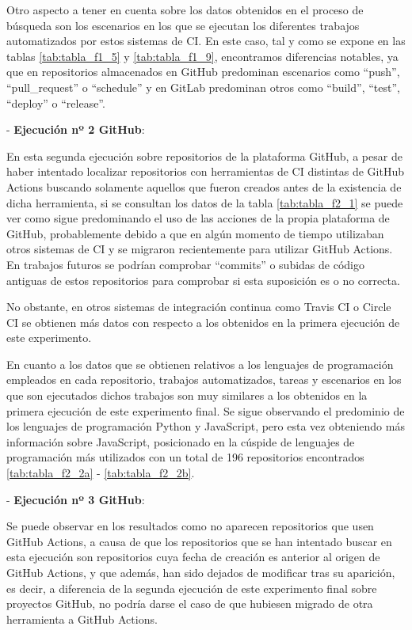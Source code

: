 Otro aspecto a tener en cuenta sobre los datos obtenidos en el proceso de búsqueda son los escenarios en los que se ejecutan los diferentes trabajos automatizados por estos sistemas de CI. En este caso, tal y como se expone en las tablas \ref{tab:tabla_f1_5} y \ref{tab:tabla_f1_9}, encontramos diferencias notables, ya que en repositorios almacenados en GitHub predominan escenarios como ``push'', ``pull\_request'' o ``schedule'' y en GitLab predominan otros como ``build'', ``test'', ``deploy'' o ``release''.

- \textbf{Ejecución nº 2 GitHub}:

En esta segunda ejecución sobre repositorios de la plataforma GitHub, a pesar de haber intentado localizar repositorios con herramientas de CI distintas de GitHub Actions buscando solamente aquellos que fueron creados antes de la existencia de dicha herramienta, si se consultan los datos de la tabla \ref{tab:tabla_f2_1} se puede ver como sigue predominando el uso de las acciones de la propia plataforma de GitHub, probablemente debido a que en algún momento de tiempo utilizaban otros sistemas de CI y se migraron recientemente para utilizar GitHub Actions. En trabajos futuros se podrían comprobar ``commits'' o subidas de código antiguas de estos repositorios para comprobar si esta suposición es o no correcta.

No obstante, en otros sistemas de integración continua como Travis CI o Circle CI se obtienen más datos con respecto a los obtenidos en la primera ejecución de este experimento.

En cuanto a los datos que se obtienen relativos a los lenguajes de programación empleados en cada repositorio, trabajos automatizados, tareas y escenarios en los que son ejecutados dichos trabajos son muy similares a los obtenidos en la primera ejecución de este experimento final. Se sigue observando el predominio de los lenguajes de programación Python y JavaScript, pero esta vez obteniendo más información sobre JavaScript, posicionado en la cúspide de lenguajes de programación más utilizados con un total de 196 repositorios encontrados \ref{tab:tabla_f2_2a} - \ref{tab:tabla_f2_2b}.

- \textbf{Ejecución nº 3 GitHub}:

Se puede observar en los resultados como no aparecen repositorios que usen GitHub Actions, a causa de que los repositorios que se han intentado buscar en esta ejecución son repositorios cuya fecha de creación es anterior al origen de GitHub Actions, y que además, han sido dejados de modificar tras su aparición, es decir, a diferencia de la segunda ejecución de este experimento final sobre proyectos GitHub, no podría darse el caso de que hubiesen migrado de otra herramienta a GitHub Actions.

